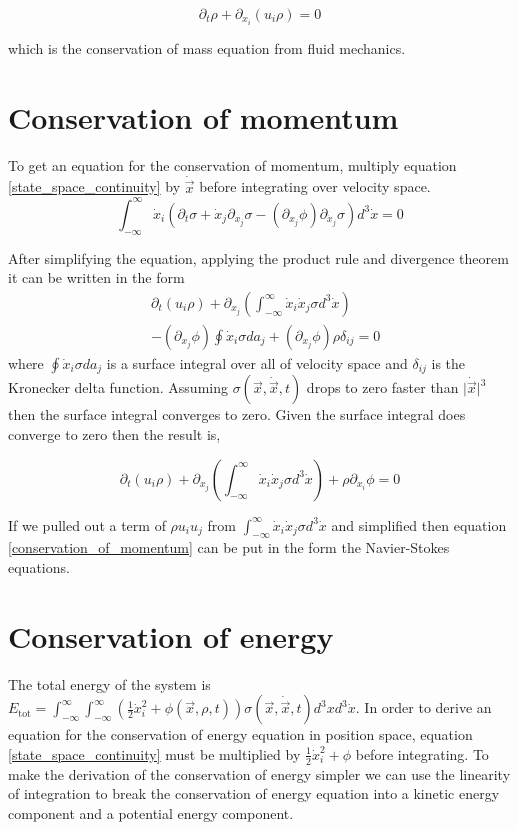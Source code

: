 \documentclass[%
 twocolumn,
 amsmath,amssymb,
 aps,
]{revtex4-1}
\newcommand{\dvec}[1]{\dot{\vec{#1}}}
\newcommand{\intVdot}[1]{\int_{-\infty}^{\infty} #1 d^3\dot{x}}
\newcommand{\intVVdot}[1]{\int_{-\infty}^{\infty}\int_{-\infty}^{\infty} #1 d^3xd^3\dot{x}}
\begin{document}
\begin{equation}
\partial_t\rho + \partial_{x_i}\left(u_i\rho\right)=0
\label{conservation_of_mass}
\end{equation}

which is the conservation of mass equation from fluid mechanics.

\section{Conservation of momentum}
To get an equation for the conservation of momentum, multiply equation \eqref{state_space_continuity} by $\dvec{x}$ before integrating over velocity space.
\[
\intVdot{\dot{x}_i\left(\partial_t \sigma + \dot{x}_j\partial_{x_j}\sigma-\left(\partial_{x_j}\phi\right)\partial_{\dot{x}_j}\sigma\right)}=0
\]

After simplifying the equation, applying the product rule and divergence theorem it can be written in the form
\[
\begin{split}
& \partial_t\left(u_i\rho\right) + \partial_{x_j}\left(\intVdot{\dot{x}_i\dot{x}_j\sigma}\right) \\ & - \left(\partial_{x_j}\phi\right)\oint\dot{x}_i\sigma da_j + \left(\partial_{x_j}\phi\right)\rho\delta_{i j}=0
\end{split}
\]
where $\oint\dot{x}_i\sigma da_j$ is a surface integral over all of velocity space and $\delta_{ij}$ is the Kronecker delta function. Assuming $\sigma(\vec{x}, \dvec{x}, t)$ drops to zero faster than $\lvert\dvec{x}\rvert^3$ then the surface integral converges to zero. Given the surface integral does converge to zero then the result is,

\begin{equation}
\partial_t\left(u_i\rho\right) + \partial_{x_j}\left(\intVdot{\dot{x}_i\dot{x}_j\sigma}\right) + \rho\partial_{x_i}\phi=0
\label{conservation_of_momentum}
\end{equation}

If we pulled out a term of $\rho u_i u_j$ from $\intVdot{\dot{x}_i\dot{x}_j\sigma}$ and simplified then equation \eqref{conservation_of_momentum} can be put in the form the Navier-Stokes equations.

\section{Conservation of energy}
The total energy of the system is $E_{\text{tot}}=\intVVdot{\left(\frac{1}{2}\dot{x}_i^2 + \phi(\vec{x}, \rho, t)\right)\sigma(\vec{x}, \dvec{x}, t)}$.  In order to derive an equation for the conservation of energy equation in position space, equation \eqref{state_space_continuity} must be multiplied by $\frac{1}{2}\dot{x}_i^2 + \phi$ before integrating. To make the derivation of the conservation of energy simpler we can use the linearity of integration to break the conservation of energy equation into a kinetic energy component and a potential energy component.
\end{document}
